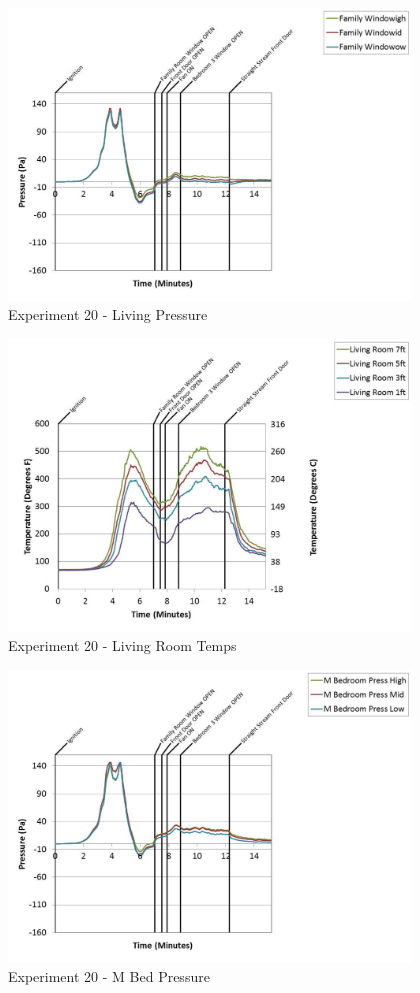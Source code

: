 \documentclass{article}
\begin{document}
\begin{appendices}
	\begin{figure}[h!]
		\centering
		\includegraphics[height=3.05in]{0_Images/Results_Charts/Exp_20_Charts/LivingPressure.pdf}
		\caption{Experiment 20 - Living Pressure}
	\end{figure}
 
	\clearpage

	\begin{figure}[h!]
		\centering
		\includegraphics[height=3.05in]{0_Images/Results_Charts/Exp_20_Charts/LivingRoomTemps.pdf}
		\caption{Experiment 20 - Living Room Temps}
	\end{figure}
 

	\begin{figure}[h!]
		\centering
		\includegraphics[height=3.05in]{0_Images/Results_Charts/Exp_20_Charts/MBedPressure.pdf}
		\caption{Experiment 20 - M Bed Pressure}
	\end{figure}
 

\end{appendices}
\end{document}
